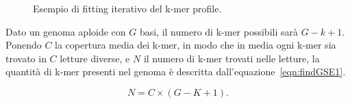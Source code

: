 \documentclass[crop=false, class=book]{standalone}
\begin{document}
	\begin{figure}[h]
		\centering
		 \quad
		 \quad
		\caption{Esempio di fitting iterativo del k-mer profile.}
		\label{fig:findGSEfitting}
	\end{figure}


	Dato un genoma aploide con $G$ basi, il numero di k-mer possibili sarà $G-k+1$. Ponendo $C$ la copertura media dei k-mer, in modo che in media ogni k-mer sia trovato in $C$ letture diverse, e $N$ il numero di k-mer trovati nelle letture, la quantità di k-mer presenti nel genoma è descritta dall'equazione~\vref{eqn:findGSE1}. 	
	
	\begin{equation}
		\label{eqn:findGSE1}
		N=C \times (G-K+1).
	\end{equation}
		
\end{document}
